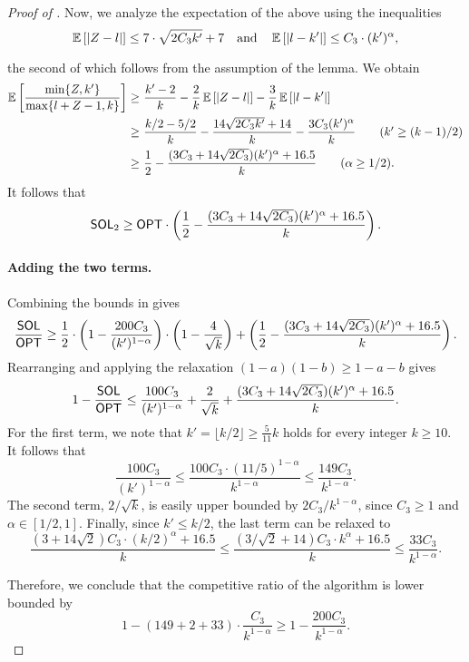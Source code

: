 \begin{proof}[Proof of ]
Now, we analyze the expectation of the above using the inequalities
\[
    \operatorname*{\mathbb{E}}_{}\left[|Z - l|\right] \le 7\cdot\sqrt{2C_3k'} + 7
\quad\text{and}\quad
    \operatorname*{\mathbb{E}}_{}\left[|l - k'|\right] \le C_3 \cdot (k')^{\alpha},
\]
the second of which follows from the assumption of the lemma. We obtain
\begin{align*}
    \operatorname*{\mathbb{E}}_{}\left[\frac{\min\{Z, k'\}}{\max\{l+Z-1, k\}}\right]
\ge &~\frac{k'-2}{k} - \frac{2}{k}\operatorname*{\mathbb{E}}_{}\left[|Z-l|\right] - \frac{3}{k}\operatorname*{\mathbb{E}}_{}\left[|l-k'|\right]\\
\ge &~\frac{k/2 - 5/2}{k} - \frac{14\sqrt{2C_3k'} + 14}{k} - \frac{3C_3(k')^{\alpha}}{k} \tag{$k' \ge (k-1)/2$}\\
\ge &~\frac{1}{2} - \frac{(3C_3 + 14\sqrt{2C_3})(k')^{\alpha} + 16.5}{k} \tag{$\alpha \ge 1/2$}.
\end{align*}
It follows that
\begin{equation}\label{eq:SOL-2-bound}
    \mathsf{SOL}_2
\ge \mathsf{OPT}\cdot \left(\frac{1}{2} - \frac{(3C_3 + 14\sqrt{2C_3})(k')^{\alpha} + 16.5}{k}\right).
\end{equation}

\paragraph{Adding the two terms.} Combining the bounds in  gives
\[
    \frac{\mathsf{SOL}}{\mathsf{OPT}}
\ge \frac{1}{2}\cdot\left(1 - \frac{200C_3}{(k')^{1-\alpha}}\right)\cdot\left(1 - \frac{4}{\sqrt{k}}\right) + \left(\frac{1}{2} - \frac{(3C_3 + 14\sqrt{2C_3})(k')^{\alpha} + 16.5}{k}\right).
\]
Rearranging and applying the relaxation $(1-a)(1-b) \ge 1 - a - b$ gives
\[
    1 - \frac{\mathsf{SOL}}{\mathsf{OPT}}
\le \frac{100C_3}{(k')^{1-\alpha}} + \frac{2}{\sqrt{k}} + \frac{(3C_3 + 14\sqrt{2C_3})(k')^{\alpha} + 16.5}{k}.
\]
For the first term, we note that $k' = \lfloor k/2\rfloor \ge \frac{5}{11}k$ holds for every integer $k \ge 10$. It follows that
\[
    \frac{100C_3}{(k')^{1-\alpha}}
\le \frac{100C_3 \cdot (11/5)^{1 - \alpha}}{k^{1-\alpha}}
\le \frac{149C_3}{k^{1 - \alpha}}.
\]
The second term, $2/\sqrt{k}$, is easily upper bounded by $2C_3/k^{1 - \alpha}$, since $C_3 \ge 1$ and $\alpha \in [1/2, 1]$. Finally, since $k' \le k/2$, the last term can be relaxed to
\[
    \frac{(3 + 14\sqrt{2})C_3\cdot(k/2)^{\alpha} + 16.5}{k}
\le \frac{(3/\sqrt{2} + 14)C_3\cdot k^{\alpha} + 16.5}{k}
\le \frac{33C_3}{k^{1 - \alpha}}.
\]

Therefore, we conclude that the competitive ratio of the algorithm is lower bounded by
\[
    1 - (149 + 2 + 33)\cdot \frac{C_3}{k^{1 - \alpha}}
\ge 1 - \frac{200C_3}{k^{1 - \alpha}}.
\]
\end{proof}

